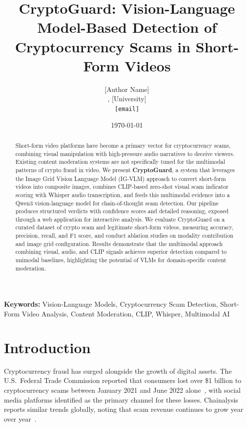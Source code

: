 \documentclass[12pt,a4paper]{article}
\title{\textbf{CryptoGuard: Vision-Language Model-Based Detection of\\
Cryptocurrency Scams in Short-Form Videos}}
\author{
  [Author Name]\\
  [Department], [University]\\
  \texttt{[email]}
}
\date{\today}
\begin{document}
\maketitle

\begin{abstract}
Short-form video platforms have become a primary vector for cryptocurrency
scams, combining visual manipulation with high-pressure audio narratives
to deceive viewers. Existing content moderation systems are not specifically
tuned for the multimodal patterns of crypto fraud in video.
We present \textbf{CryptoGuard}, a system that leverages the Image Grid
Vision Language Model (IG-VLM) approach to convert short-form videos into
composite images, combines CLIP-based zero-shot visual scam indicator
scoring with Whisper audio transcription, and feeds this multimodal
evidence into a Qwen3 vision-language model for chain-of-thought scam
detection.
Our pipeline produces structured verdicts with confidence scores and
detailed reasoning, exposed through a web application for interactive
analysis.
We evaluate CryptoGuard on a curated dataset of crypto scam and legitimate
short-form videos, measuring accuracy, precision, recall, and F1 score,
and conduct ablation studies on modality contribution and image grid
configuration.
Results demonstrate that the multimodal approach combining visual, audio,
and CLIP signals achieves superior detection compared to unimodal baselines,
highlighting the potential of VLMs for domain-specific content moderation.
\end{abstract}

\textbf{Keywords:} Vision-Language Models, Cryptocurrency Scam Detection,
Short-Form Video Analysis, Content Moderation, CLIP, Whisper, Multimodal AI

\section{Introduction}

Cryptocurrency fraud has surged alongside the growth of digital assets.
The U.S.\ Federal Trade Commission reported that consumers lost over
\$1 billion to cryptocurrency scams between January 2021 and June 2022
alone~\cite{ftc2023}, with social media platforms identified as the
primary channel for these losses. Chainalysis reports similar trends
globally, noting that scam revenue continues to grow year over year~\cite{chainalysis2024}.
\end{document}
